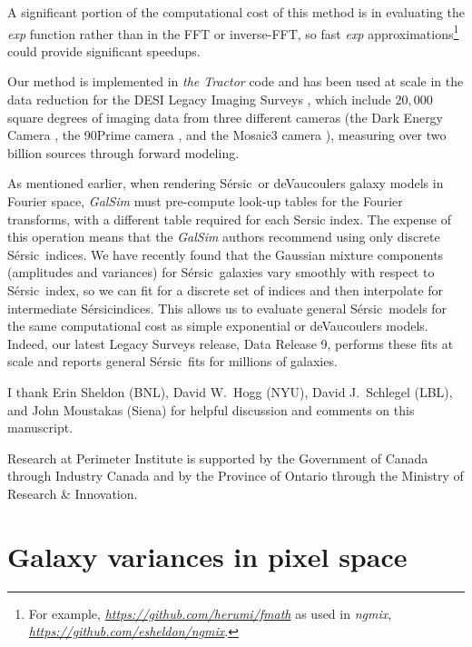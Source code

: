 \documentclass[11pt,preprint]{aastex}
\newcommand{\niceurl}[1]{\href{#1}{\textsl{#1}}}
\newcommand{\project}[1]{\textsl{#1}}
\newcommand{\sersic}{S\'ersic}
\begin{document}
A significant portion of the computational cost of this method is in
evaluating the \emph{exp} function rather than in the FFT or
inverse-FFT, so fast \emph{exp} approximations\footnote{For example,
  \niceurl{https://github.com/herumi/fmath} as used in
  \project{ngmix}, \niceurl{https://github.com/esheldon/ngmix}.}
could provide significant speedups.
%


Our method is implemented in \project{the Tractor} code and has been
used at scale in the data reduction for the DESI Legacy Imaging Surveys
\citep{dey}, which include $20,000$ square degrees of imaging data from
three different cameras (the Dark Energy Camera \citep{decam},
the 90Prime camera \citep{90prime}, and the Mosaic3 camera \citep{mosaic3}),
measuring over two billion sources through forward modeling.


As mentioned earlier, when rendering \sersic\ or deVaucoulers galaxy
models in Fourier space, \project{GalSim} must pre-compute look-up
tables for the Fourier transforms, with a different table required for
each Sersic index.  The expense of this operation means that the
\project{GalSim} authors recommend using only discrete
\sersic\ indices.  We have recently found that the Gaussian mixture
components (amplitudes and variances) for \sersic\ galaxies vary
smoothly with respect to \sersic\ index, so we can fit for a discrete
set of indices and then interpolate for intermediate \sersic indices.
This allows us to evaluate general \sersic\ models for the same
computational cost as simple exponential or deVaucoulers models.
Indeed, our latest Legacy Surveys release, Data Release 9, performs
these fits at scale and reports general \sersic\ fits for millions of
galaxies.




\acknowledgements

I thank Erin Sheldon (BNL),
David W.~Hogg (NYU), David J.~Schlegel (LBL), and John Moustakas (Siena)
for helpful discussion and comments on this manuscript.

Research at Perimeter Institute is supported by the Government of
Canada through Industry Canada and by the Province of Ontario through
the Ministry of Research \& Innovation.


\appendix

\section{Galaxy variances in pixel space}
\label{app:transform}
\end{document}
